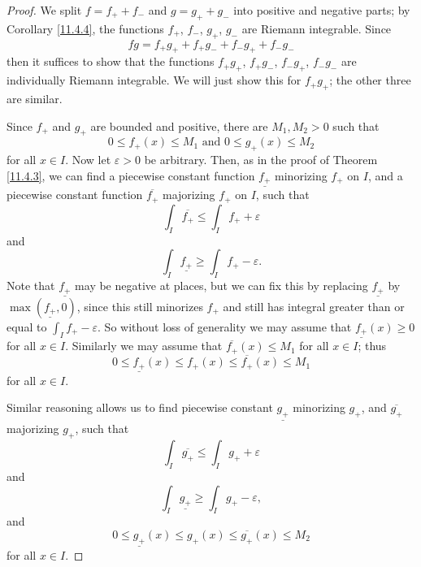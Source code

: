 \begin{proof}
    We split \(f = f_+ + f_-\) and \(g = g_+ + g_-\) into positive and negative parts;
    by Corollary \ref{11.4.4}, the functions \(f_+\), \(f_-\), \(g_+\), \(g_-\) are Riemann integrable.
    Since
    \[
        fg = f_+ g_+ + f_+ g_- + f_- g_+ + f_- g_-
    \]
    then it suffices to show that the functions \(f_+ g_+\), \(f_+ g_-\), \(f_- g_+\), \(f_- g_-\) are individually Riemann integrable.
    We will just show this for \(f_+ g_+\);
    the other three are similar.

    Since \(f_+\) and \(g_+\) are bounded and positive, there are \(M_1, M_2 > 0\) such that
    \[
        0 \leq f_+(x) \leq M_1 \text{ and } 0 \leq g_+(x) \leq M_2
    \]
    for all \(x \in I\).
    Now let \(\varepsilon > 0\) be arbitrary.
    Then, as in the proof of Theorem \ref{11.4.3}, we can find a piecewise constant function \(\underline{f_+}\) minorizing \(f_+\) on \(I\), and a piecewise constant function \(\overline{f_+}\) majorizing \(f_+\) on \(I\), such that
    \[
        \int_I \overline{f_+} \leq \int_I f_+ + \varepsilon
    \]
    and
    \[
        \int_I \underline{f_+} \geq \int_I f_+ - \varepsilon.
    \]
    Note that \(\underline{f_+}\) may be negative at places, but we can fix this by replacing \(\underline{f_+}\) by \(\max(\underline{f_+}, 0)\), since this still minorizes \(f_+\) and still has integral greater than or equal to \(\int_I f_+ - \varepsilon\).
    So without loss of generality we may assume that \(\underline{f_+}(x) \geq 0\) for all \(x \in I\).
    Similarly we may assume that \(\overline{f_+}(x) \leq M_1\) for all \(x \in I\);
    thus
    \[
        0 \leq \underline{f_+}(x) \leq f_+(x) \leq \overline{f_+}(x) \leq M_1
    \]
    for all \(x \in I\).

    Similar reasoning allows us to find piecewise constant \(\underline{g_+}\) minorizing \(g_+\), and \(\overline{g_+}\) majorizing \(g_+\), such that
    \[
        \int_I \overline{g_+} \leq \int_I g_+ + \varepsilon
    \]
    and
    \[
        \int_I \underline{g_+} \geq \int_I g_+ - \varepsilon,
    \]
    and
    \[
        0 \leq \underline{g_+}(x) \leq g_+(x) \leq \overline{g_+}(x) \leq M_2
    \]
    for all \(x \in I\).


\end{proof}
